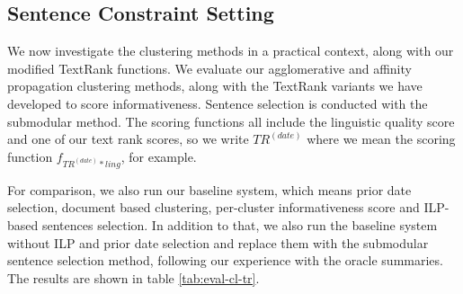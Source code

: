 \documentclass[a4paper,BCOR=10mm]{report}
\numberwithin{lemma}{chapter}
\numberwithin{definition}{chapter}
\begin{document}


\subsection{Sentence Constraint Setting}

%
%



We now investigate the clustering methods in a practical context, along with our modified TextRank functions.
We evaluate our agglomerative and affinity propagation clustering methods, along with the TextRank variants we have developed to score informativeness. Sentence selection is conducted with the submodular method.
The scoring functions all include the linguistic quality score and one of our text rank scores, so we write $TR^{(date)}$ where we mean the scoring function $f_{TR^{(date)} * ling}$, for example.

For comparison, we also run our baseline system, which means prior date selection, document based clustering, per-cluster informativeness score and ILP-based sentences selection.
In addition to that, we also run the baseline system without ILP and prior date selection and replace them with the submodular sentence selection method, following our experience with the oracle summaries.
The results are shown in table \ref{tab:eval-cl-tr}.
\end{document}
